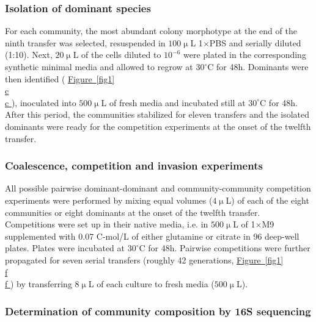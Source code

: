 \documentclass[a4paper,10pt]{article}
\newcommand{\figref}[2][]{%
  \hyperref[{#2}]{%
    Figure~\ref*{#2}%
    \ifx\\#1\\%
    \else
      #1%
    \fi
  }%
}
\begin{document}
\subsubsection*{Isolation of dominant species}\label{methods:dominants}

For each community, the most abundant colony morphotype at the end of the ninth transfer
was selected, resuspended in $100\upmu$L 1$\times$PBS and serially diluted (1:10).
Next, $20\upmu$L of the cells diluted to $10^{-6}$ were plated in the corresponding synthetic
minimal media and allowed to regrow at $30^\circ$C for 48h. Dominants were then identified
(\figref[c]{fig1}),
inoculated into $500\upmu$L of fresh media and incubated still at $30^\circ$C for 48h.
After this period, the communities stabilized for eleven transfers and the isolated dominants
were ready for the competition experiments at the onset of the twelfth transfer.

\subsubsection*{Coalescence, competition and invasion experiments}
\label{methods:competitions}

All possible pairwise dominant-dominant and community-community
competition experiments
were performed by mixing equal volumes ($4\upmu$L) of each of the eight
communities or eight dominants at the onset of the twelfth transfer.
Competitions were set up in their native media,
i.e. in $500\upmu$L of 1$\times$M9 supplemented with 0.07 C-mol/L of
either glutamine or citrate in 96 deep-well plates.
Plates were incubated at $30^\circ$C for 48h.
Pairwise competitions were further propagated for seven serial transfers
(roughly 42 generations, \figref[f]{fig1}) by transferring $8\upmu$L of
each culture to fresh media ($500\upmu$L).

\subsubsection*{Determination of community composition by 16S sequencing}
\label{methods:sequencing}
\end{document}
